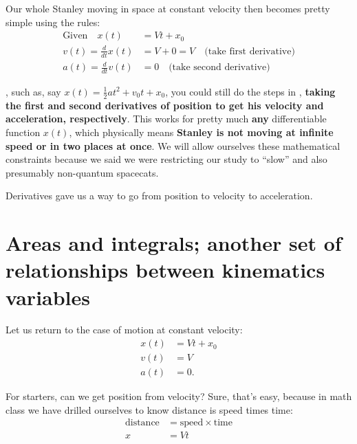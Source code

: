 \documentclass{tufte-handout}
\begin{document}
Our whole Stanley moving in space at constant velocity then becomes pretty simple using the rules: 
\begin{align}
\text{Given}\quad x(t) &= V t + x_0 \\
v(t) = \frac{d}{dt} x(t) &= V + 0 = V\quad\text{(take first derivative)} \\
a(t) = \frac{d}{dt} v(t) &= 0\quad\text{(take second derivative)}
\label{eq:derivatives4}
\end{align}

, such as, say $x(t)=\frac{1}{2}at^2 + v_0 t + x_0$, you could still do the steps in , \textbf{taking the first and second derivatives of position to get his velocity and acceleration, respectively}. This works for pretty much \textbf{any} differentiable function $x(t)$, which physically means \textbf{Stanley is not moving at infinite speed or in two places at once}. We will allow ourselves these mathematical constraints because we said we were restricting our study to ``slow'' and also presumably non-quantum spacecats. 

Derivatives gave us a way to go from position to velocity to acceleration. 

\section{Areas and integrals; another set of relationships between kinematics variables}
Let us return to the case of motion at constant velocity: 
\begin{align}
x(t) &= V t + x_0 \\
v(t) &= V \\
a(t) &= 0.
\end{align}

For starters, can we get position from velocity? Sure, that's easy, because in math class we have drilled ourselves to know distance is speed times time:
\begin{align}
\text{distance} &= \text{speed} \times \text{time} \\
x &= V t
\label{eq:integrals1}
\end{align}
\end{document}

